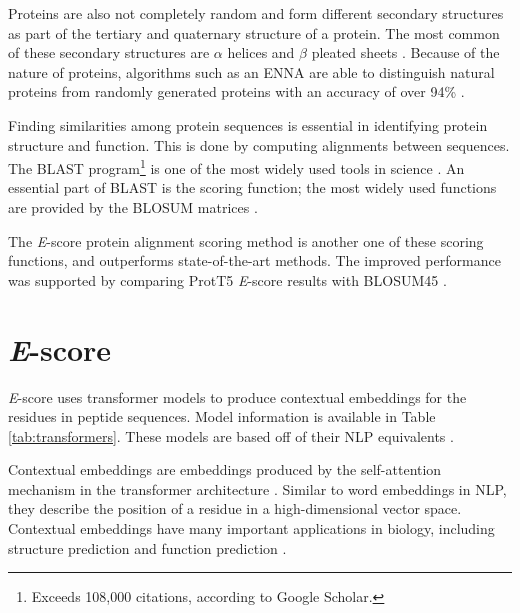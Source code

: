 Proteins are also not completely random and form different secondary structures as part of the tertiary and quaternary structure of a protein. The most common of these secondary structures are \(\alpha\) helices and \(\beta\) pleated sheets \cite{Ma:2018}. Because of the nature of proteins, algorithms such as an \gls{ENNA} are able to distinguish natural proteins from randomly generated proteins with an accuracy of over 94\% \cite{Lucrezia:2012}.

Finding similarities among protein sequences is essential in identifying protein structure and function. This is done by computing alignments between sequences. The \gls{BLAST} program\footnote{Exceeds 108,000 citations, according to Google Scholar.} is one of the most widely used tools in science \cite{Atschul:1990}. An essential part of BLAST is the scoring function; the most widely used functions are provided by the BLOSUM matrices \cite{Henikoff:1992}.

The \textit{E}-score protein alignment scoring method \cite{Ashrafzadeh:2023} is another one of these scoring functions, and outperforms state-of-the-art methods. The improved performance was supported by comparing ProtT5 \cite{Elnaggar:2021} \textit{E}-score results with BLOSUM45 \cite{Henikoff:1992,Ashrafzadeh:2023}.

\section{\textit{E}-score}
\textit{E}-score uses \gls{transformer} models to produce contextual embeddings for the \glspl{residue} in \gls{peptide} sequences. Model information is available in Table \ref{tab:transformers}. These models are based off of their \gls{NLP} equivalents \cite{Raffel:2020, Devlin:2018, Zhenzhong:2020, Yang:2022, Rives:2021}.

Contextual embeddings are embeddings produced by the self-attention mechanism in the \gls{transformer} architecture \cite{Vaswani:2017}. Similar to word embeddings in \gls{NLP}, they describe the position of a \gls{residue} in a high-dimensional vector space. Contextual embeddings have many important applications in biology, including structure prediction \cite{Senior:2020, Yang:2019, Jumper:2021} and function prediction \cite{Kulmanov:2019, Gligorijevic:2021, Lai:2021}. 

